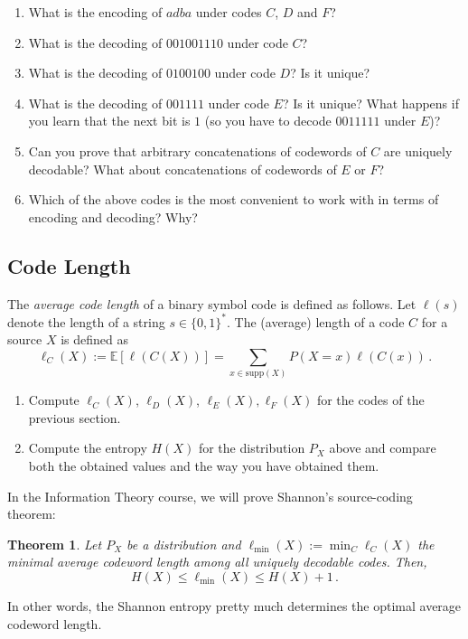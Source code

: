 \documentclass[11p,a4paper]{article}
\newtheorem{theorem}{Theorem}
\begin{document}
\begin{enumerate}
\item What is the encoding of $adba$ under codes $C$, $D$ and $F$?
\item What is the decoding of $001001110$ under code $C$?
\item What is the decoding of $0100100$ under code $D$? Is it unique?
\item What is the decoding of $001111$ under code $E$? Is it unique?
  What happens if you learn that the next bit is $1$ (so you have to decode
  $0011111$ under $E$)?
\item Can you prove that arbitrary concatenations of codewords of $C$
  are uniquely decodable? What about concatenations of codewords of
  $E$ or $F$?
\item Which of the above codes is the most convenient to work with in
  terms of encoding and decoding? Why?
\end{enumerate}

\subsection{Code Length}
\newcommand{\len}{\ell}
 The \emph{average code length} of a binary symbol code is defined as follows.
Let $\len(s)$ denote the length of a string $s \in \{0,1\}^*$. The (average) length of a code $C$ for a source $X$ is defined as
\[
\len_C(X) := \mathbb{E}[\len(C(X))] = \sum_{x \in \mathrm{supp}(X)} P(X=x) \len(C(x)) \, .
\]
\begin{enumerate}
\item Compute $\len_C(X)$, $\len_D(X)$, $\len_E(X), \len_F(X)$ for the codes of the previous section.
\item Compute the entropy $H(X)$ for the distribution $P_X$ above and compare both the obtained values and the way you have obtained them.
\end{enumerate}

In the Information Theory course, we will prove Shannon's
source-coding theorem:
\begin{theorem}
Let $P_X$ be a distribution and $\ell_{\min}(X) := \min_C \len_C(X)$
the minimal average codeword length among all uniquely decodable
codes. Then,
\[
H(X) \leq \ell_{\min}(X) \leq H(X)+1 \, .
\]
\end{theorem}
In other words, the Shannon entropy pretty much determines the optimal
average codeword length.
\end{document}
